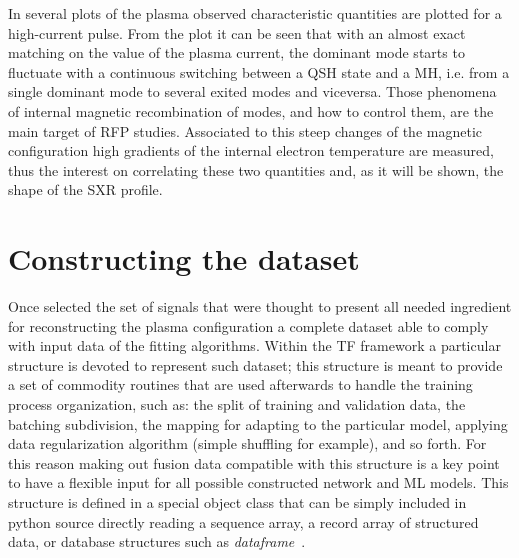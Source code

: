In \Figure{\ref{fig:rfx_shot_22069}} several plots of the plasma observed characteristic quantities are plotted for a high-current pulse. From the plot it can be seen that with an almost exact matching on the value of the plasma current, the dominant mode starts to fluctuate with a continuous switching between a QSH state and a MH, i.e. from a single dominant mode to several exited modes and viceversa. Those phenomena of internal magnetic recombination of modes, and how to control them, are the main target of RFP studies. 
Associated to this steep changes of the magnetic configuration high gradients of the internal electron temperature are measured, thus the interest on correlating these two quantities and, as it will be shown, the shape of the SXR profile. 


                                   
\section{Constructing the dataset} %



Once selected the set of signals that were thought to present all needed ingredient for reconstructing the plasma configuration a complete dataset able to comply with \Tensorflow input data of the fitting algorithms. Within the \acs{TF} framework a particular structure is devoted to represent such dataset; this structure is meant to provide a set of commodity routines that are used afterwards to handle the training process organization, such as: the split of training and validation data, the batching subdivision, the mapping for adapting to the particular model, applying data regularization algorithm (simple shuffling for example), and so forth.
For this reason making out fusion data compatible with this structure is a key point to have a flexible input for all possible constructed network and ML models. 
This structure is defined in a special \TF object class that can be simply included in python source directly reading a sequence array, a record array of structured data, or database structures such as \Pandas \textit{dataframe}~\cite{mckinney-proc-scipy-2010}.

